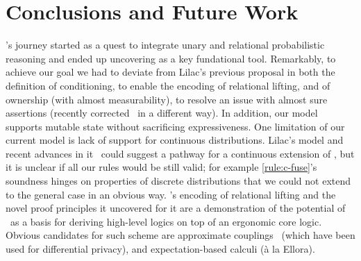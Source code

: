 \section{Conclusions and Future Work}
\thelogic's journey started as a quest to integrate unary and relational
probabilistic reasoning and ended up uncovering \supercond{}
as a key fundational tool.
Remarkably, to achieve our goal we had to deviate from Lilac's previous
proposal in both the definition of conditioning,
  to enable the encoding of relational lifting,
and of ownership (with almost measurability),
  to resolve an issue with almost sure assertions
(recently corrected~\cite{lilac2} in a different way).
In addition, our model supports mutable state without sacrificing
expressiveness.
One limitation of our current model is lack of support for continuous
distributions.
Lilac's model and recent advances in it~\cite{LiAJ0H24} could suggest a pathway for a continuous extension of \thelogic,
but it is unclear if all our rules would be still valid;
for example \cref{rule:c-fuse}'s soundness hinges on properties of discrete distributions that we could not extend to the general case in an obvious way.
\thelogic's encoding of relational lifting and the novel proof principles it uncovered for it are a demonstration of the potential
of \supercond\ as a basis for deriving high-level logics on top of an ergonomic
core logic.
Obvious candidates for such scheme are approximate couplings~\cite{apRHL}
(which have been used for \eg differential privacy),
and expectation-based calculi (à la Ellora).

